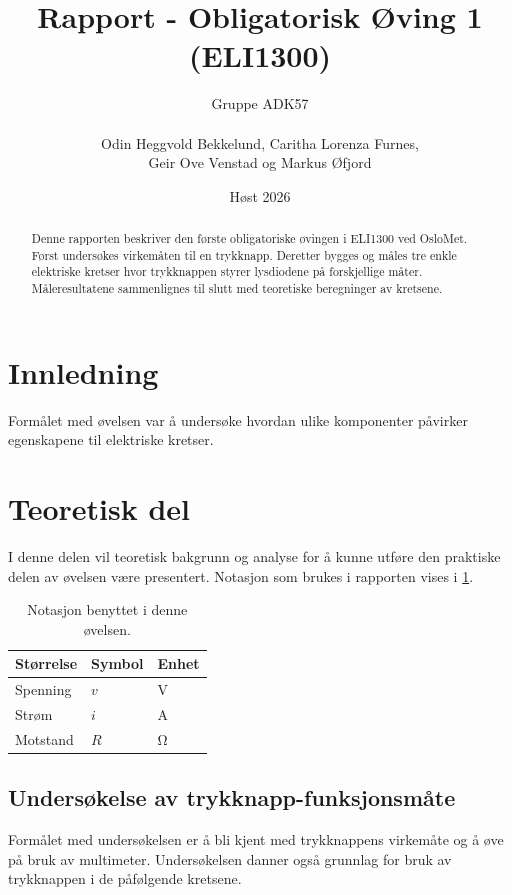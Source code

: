\documentclass[11pt,a4paper,twocolumn]{article}
\title{Rapport - Obligatorisk Øving 1 (ELI1300)}
\author{
	Gruppe ADK57
	\\\\
	Odin Heggvold Bekkelund, Caritha Lorenza Furnes,
	\\
	Geir Ove Venstad og Markus Øfjord
}
\date{Høst 2026}
\begin{document}
\maketitle %

\begin{abstract}
Denne rapporten beskriver den første obligatoriske øvingen i ELI1300 ved OsloMet. Først undersøkes virkemåten til en trykknapp. Deretter bygges og måles tre enkle elektriske kretser hvor trykknappen styrer lysdiodene på forskjellige måter. Måleresultatene sammenlignes til slutt med teoretiske beregninger av kretsene.
\end{abstract}

\section{Innledning}
Formålet med øvelsen var å undersøke hvordan ulike komponenter påvirker egenskapene til elektriske kretser.

\section{Teoretisk del}
I denne delen vil teoretisk bakgrunn og analyse for å kunne utføre den praktiske delen av øvelsen være presentert. Notasjon som brukes i rapporten vises i \cref{tab:notasjon}.
 
 \begin{table}[h]
 	\centering
 	\setlength{\belowcaptionskip}{6pt}
 	\caption{Notasjon benyttet i denne øvelsen.}
 	\label{tab:notasjon}
 	\noindent
 	\begin{tabular}{@{}lll@{}}
 		\hline
 		Størrelse & Symbol & Enhet \\
 		\hline
 		Spenning & $v$ & \unit{\volt} \\
 		Strøm & $i$ & \unit{\ampere} \\
 		Motstand & $R$ & \unit{\ohm} \\
 		\hline
 	\end{tabular}
 \end{table}
 
 
\subsection{Undersøkelse av trykknapp-funksjonsmåte}

Formålet med undersøkelsen er å bli kjent med trykknappens virkemåte og å øve på bruk av multimeter. Undersøkelsen danner også grunnlag for bruk av trykknappen i de påfølgende kretsene.
\end{document}
